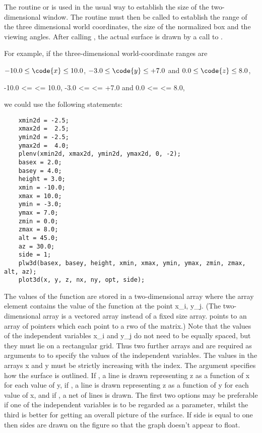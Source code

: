 The routine  or  is used in the usual way to
establish the size of the two-dimensional window.  The routine
 must then be called to establish the range of the three
dimensional world coordinates, the size of the normalized box and the
viewing angles.  After calling , the actual surface is drawn
by a call to .

For example, if the three-dimensional world-coordinate ranges are
\begin{tex}
$-10.0\le\code{x}\le 10.0$, $-3.0\le\code{y}\le +7.0$ and 
$0.0\le\code{z}\le 8.0$, 
\end{tex}
\begin{ifinfo}
-10.0 <=  <=  10.0, -3.0 <=  <=  +7.0 and
0.0 <=  <=  8.0, 
\end{ifinfo}
we could use the following statements:

\begin{verbatim}
    xmin2d = -2.5;
    xmax2d =  2.5;
    ymin2d = -2.5;
    ymax2d =  4.0;
    plenv(xmin2d, xmax2d, ymin2d, ymax2d, 0, -2);
    basex = 2.0;
    basey = 4.0;
    height = 3.0;
    xmin = -10.0;
    xmax = 10.0;
    ymin = -3.0;
    ymax = 7.0;
    zmin = 0.0;
    zmax = 8.0;
    alt = 45.0;
    az = 30.0;
    side = 1;
    plw3d(basex, basey, height, xmin, xmax, ymin, ymax, zmin, zmax, alt, az);
    plot3d(x, y, z, nx, ny, opt, side);
\end{verbatim}

The values of the function are stored in a two-dimensional array
 where the array element  contains the value
of the function at the point x_i, y_j.  (The two-dimensional array
 is a vectored array instead of a fixed size array.  
points to an array of pointers which each point to a rwo of the matrix.)
Note that the values of the independent variables x_i and y_j do not
need to be equally spaced, but they must lie on a rectangular grid.
Thus two further arrays  and  are required as
arguments to  to specify the values of the independent
variables.  The values in the arrays x and y must be strictly increasing
with the index.  The argument  specifies how the surface is
outlined.  If , a line is drawn representing z as a
function of x for each value of y, if , a line is drawn
representing z as a function of y for each value of x, and if , a net of lines is drawn.  The first two options may be preferable
if one of the independent variables is to be regarded as a parameter,
whilst the third is better for getting an overall picture of the
surface.  If side is equal to one then sides are drawn on the figure so
that the graph doesn't appear to float.

